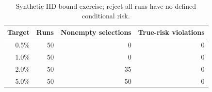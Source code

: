 \begin{table}[H]
\centering
\footnotesize
\caption{Synthetic IID bound exercise; reject-all runs have no defined conditional risk.}
\label{tab:risk-synthetic}
\begin{tabular}{|r|r|r|r|}
\hline
Target & Runs & Nonempty selections & True-risk violations \\ \hline
0.5\% & 50 & 0 & 0 \\ \hline
1.0\% & 50 & 0 & 0 \\ \hline
2.0\% & 50 & 35 & 0 \\ \hline
5.0\% & 50 & 50 & 0 \\ \hline
\end{tabular}
\end{table}
